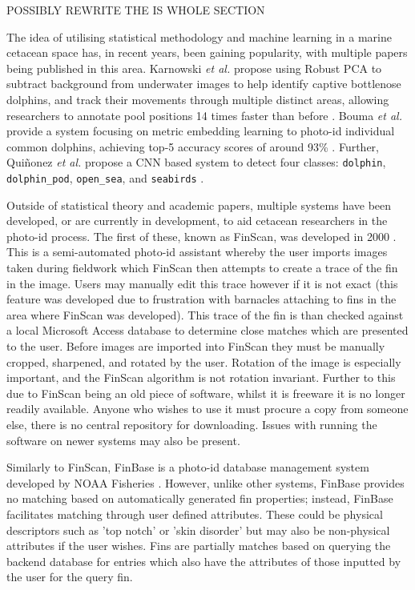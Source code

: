 POSSIBLY REWRITE THE IS WHOLE SECTION


The idea of utilising statistical methodology and machine learning in a marine cetacean space has, in recent years, been gaining popularity, with multiple papers being published in this area. Karnowski \textit{et al.} propose using Robust PCA to subtract background from underwater images to help identify captive bottlenose dolphins, and track their movements through multiple distinct areas, allowing researchers to annotate pool positions 14 times faster than before \cite{karnowski_dolphin_2015}. Bouma \textit{et al.} provide a system focusing on metric embedding learning to photo-id individual common dolphins, achieving top-5 accuracy scores of around 93\% \cite{bouma_individual_2018}. Further, Qui\~{n}onez \textit{et al.} propose a CNN based system to detect four classes: \texttt{dolphin}, \texttt{dolphin\_pod}, \texttt{open\_sea}, and \texttt{seabirds} \cite{quinonez_using_2019}. 

Outside of statistical theory and academic papers, multiple systems have been developed, or are currently in development, to aid cetacean researchers in the photo-id process. The first of these, known as FinScan, was developed in 2000 \cite{hillman_finscan_2002}. This is a semi-automated photo-id assistant whereby the user imports images taken during fieldwork which FinScan then attempts to create a trace of the fin in the image. Users may manually edit this trace however if it is not exact (this feature was developed due to frustration with barnacles attaching to fins in the area where FinScan was developed). This trace of the fin is than checked against a local Microsoft Access database to determine close matches which are presented to the user. Before images are imported into FinScan they must be manually cropped, sharpened, and rotated by the user. Rotation of the image is especially important, and the FinScan algorithm is not rotation invariant. Further to this due to FinScan being an old piece of software, whilst it is freeware it is no longer readily available. Anyone who wishes to use it must procure a copy from someone else, there is no central repository for downloading. Issues with running the software on newer systems may also be present.

Similarly to FinScan, FinBase is a photo-id database management system developed by NOAA Fisheries \cite{fisheries_finbase_2018}. However, unlike other systems, FinBase provides no matching based on automatically generated fin properties; instead, FinBase facilitates matching through user defined attributes. These could be physical descriptors such as 'top notch' or 'skin disorder' but may also be non-physical attributes if the user wishes. Fins are partially matches based on querying the backend database for entries which also have the attributes of those inputted by the user for the query fin. 

